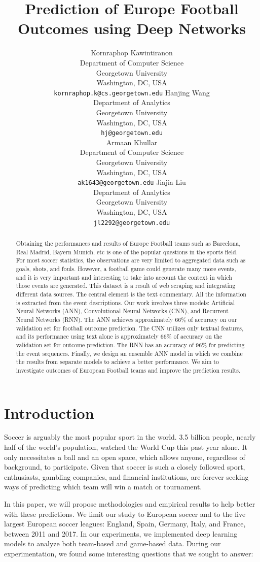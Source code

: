 \documentclass[11pt,a4paper]{article}
\title{Prediction of Europe Football Outcomes using Deep Networks}
\author{Kornraphop Kawintiranon \\
  Department of Computer Science \\
  Georgetown University \\
  Washington, DC, USA \\
  {\tt kornraphop.k@cs.georgetown.edu} \And
  Hanjing Wang \\
  Department of Analytics \\
  Georgetown University \\
  Washington, DC, USA \\
  {\tt hj@georgetown.edu}\\\AND
  Armaan Khullar \\
  Department of Computer Science \\
  Georgetown University \\
  Washington, DC, USA \\
  {\tt ak1643@georgetown.edu} \And
  Jiajia Liu \\
  Department of Analytics \\
  Georgetown University \\
  Washington, DC, USA \\
  {\tt jl2292@georgetown.edu} \\}
\date{}
\begin{document}
\maketitle
\begin{abstract}
Obtaining the performances and results of Europe Football teams such as Barcelona, Real Madrid, Bayern Munich, etc is one of the popular questions in the sports field. For most soccer statistics, the observations are very limited to aggregated data such as goals, shots, and fouls. However, a football game could generate many more events, and it is very important and interesting to take into account the context in which those events are generated. This dataset is a result of web scraping and integrating different data sources. The central element is the text commentary. All the information is extracted from the event descriptions. Our work involves three models: Artificial Neural Networks (ANN), Convolutional Neural Networks (CNN), and Recurrent Neural Networks (RNN). The ANN achieves approximately 66\% of accuracy on our validation set for football outcome prediction. The CNN utilizes only textual features, and its performance using text alone is approximately 66\% of accuracy on the validation set for outcome prediction. The RNN has an accuracy of 96\% for predicting the event sequences. Finally, we design an ensemble ANN model in which we combine the results from separate models to achieve a better performance. We aim to investigate outcomes of European Football teams and improve the prediction results.

\end{abstract}


\section{Introduction}

Soccer is arguably the most popular sport in the world. 3.5 billion people, nearly half of the world’s population, watched the World Cup this past year alone.  It only necessitates a ball and an open space, which allows anyone, regardless of background, to participate. Given that soccer is such a closely followed sport, enthusiasts, gambling companies, and financial institutions, are forever seeking ways of predicting which team will win a match or tournament.

In this paper, we will propose methodologies and empirical results to help better with these predictions. We limit our study to European soccer and to the five largest European soccer leagues: England, Spain, Germany, Italy, and France, between 2011 and 2017. In our experiments, we implemented deep learning models to analyze both team-based and game-based data. During our experimentation, we found some interesting questions that we sought to answer:
\end{document}
